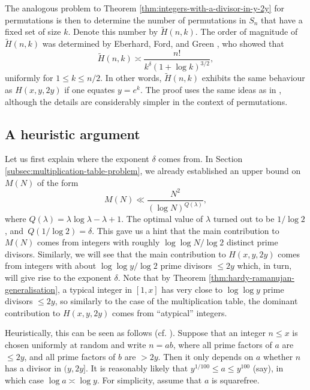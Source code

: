 \begin{remark}
    The analogous problem to Theorem \ref{thm:integers-with-a-divisor-in-y-2y} for permutations is then to determine the number of permutations in $S_n$ that have a fixed set of size $k$.
    Denote this number by $\tilde{H}(n, k)$. 
    The order of magnitude of $\tilde{H}(n,k)$ was determined by Eberhard, Ford, and Green \cite{eberhardfordgreen}, who showed that
    \begin{equation*}
        \tilde{H}(n, k) \asymp \frac{n!}{k^\delta (1 + \log k)^{3/2}},
    \end{equation*}
    uniformly for $1 \le k \le n/2$.
    In other words, $\tilde{H}(n, k)$ exhibits the same behaviour as $H(x, y, 2y)$ if one equates $y = e^{k}$.
    The proof uses the same ideas as in \cite{integerswithadivisor}, although the details are considerably simpler in the context of permutations.
\end{remark}

\subsection{A heuristic argument}
    \label{subsec:heuristic}
Let us first explain where the exponent $\delta$ comes from.
In Section \ref{subsec:multiplication-table-problem}, we already established an upper bound on $M(N)$ of the form
\begin{equation*}
    M(N) \ll \frac{N^2}{(\log N)^{Q(\lambda)}},
\end{equation*}
where $Q(\lambda) = \lambda \log \lambda - \lambda + 1$.
The optimal value of $\lambda$ turned out to be $1/\log 2$, \mbox{and $Q(1/\log 2) = \delta$.}
This gave us a hint that the main contribution to $M(N)$ comes from integers with roughly $\log \log N / \log 2$ distinct prime divisors. 
Similarly, we will see that the main contribution to $H(x, y, 2y)$ comes from integers with about $\log \log y/ \log 2$ prime divisors $\le 2y$ which, in turn, will give rise to the exponent $\delta$.
Note that by Theorem \ref{thm:hardy-ramanujan-generalisation}, a typical integer in $[1, x]$ has very close to $\log \log y$ prime divisors $\le 2y$, so similarly to the case of the multiplication table, the dominant contribution to $H(x, y, 2y)$ comes from ``atypical'' integers.

Heuristically, this can be seen as follows (cf. \cite{integerswithadivisor}).
Suppose that an integer $n \le x$ is chosen uniformly at random and write $n = ab$, where all prime factors of $a$ are $\le 2y$, and all prime factors of $b$ are $> 2y$.
Then it only depends on $a$ whether $n$ has a divisor in $(y, 2y]$.
It is reasonably likely that $y^{1/100} \le a \le y^{100}$ (say), in which case $\log a \asymp \log y$.
For simplicity, assume that $a$ is squarefree.

